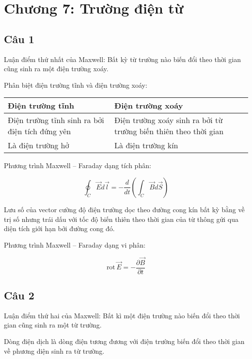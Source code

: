 \section[Chương 7]{Chương 7: Trường điện từ}

\subsection{Câu 1}

Luận điểm thứ nhất của Maxwell: Bất kỳ từ trường nào biến đổi theo thời gian cũng sinh ra một điện trường xoáy.

Phân biệt điện trường tĩnh và điện trường xoáy:

\begin{table}[H]
\centering
\begin{tabular}{|p{6cm}|p{6cm}|}
\hline
Điện trường tĩnh & Điện trường xoáy \\ \hline\hline
Điện trường tĩnh sinh ra bởi điện tích đứng yên & Điện trường xoáy sinh ra bởi từ trường biến thiên theo thời gian \\ \hline
Là điện trường hở & Là điện trường kín \\ \hline
\end{tabular}
\end{table}

Phương trình Maxwell -- Faraday dạng tích phân:

\begin{equation*}
  \oint_C \vec{E}d\vec{l} = -\frac{d}{dt} \left( \int_C \vec{B}d\vec{S} \right)
\end{equation*}

Lưu số của vector cường độ điện trường dọc theo đường cong kín bất kỳ bằng về trị số nhưng trái dấu với tốc độ biến thiên theo thời gian của từ thông gửi qua diện tích giới hạn bởi đường cong đó.

Phương trình Maxwell -- Faraday dạng vi phân:

\begin{equation*}
  \text{rot}\,\vec{E} = -\frac{\partial\vec{B}}{\partial t}
\end{equation*}

\subsection{Câu 2}

Luận điểm thứ hai của Maxwell: Bất kì một điện trường nào biến đổi theo thời gian cũng sinh ra một từ trường.

Dòng điện dịch là dòng điện tương đương với điện trường biến đổi theo thời gian về phương diện sinh ra từ trường.

